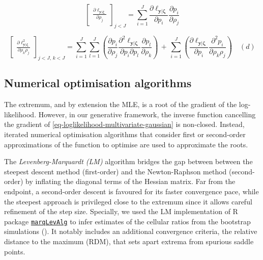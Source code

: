\documentclass[pdflatex, sn-nature]{sn-jnl}
\theoremstyle{thmstyleone}%
\theoremstyle{thmstyletwo}%
\theoremstyle{thmstylethree}%
\begin{document}
\begin{appendices}
        \begin{equation}
            \label{eq-chain-rule-first-order}
            \begin{bmatrix}
                \frac{\partial \ell_{\boldsymbol{y} | \boldsymbol{\zeta}}}{\partial \rho_{j}}
            \end{bmatrix}_{j < J}= \sum_{i=1}^{J} \frac{\partial \ell_{\boldsymbol{y}
            | \boldsymbol{\zeta}}}{\partial p_{i}}\frac{\partial p_{i}}{\partial
            \rho_{j}}
        \end{equation}

        \begin{equation}
            \label{eq-chain-rule-second-order}
            \begin{bmatrix}
                \frac{\partial \ell_{\boldsymbol{y}|\boldsymbol{\zeta}}^{2} }{\partial \rho_{k} \rho_{j}}
            \end{bmatrix}_{j < J, \, k < J}= \sum_{i=1}^{J} \sum_{l=1}^{J} \left(
            \frac{\partial p_{i} }{\partial \rho_{j}}\frac{\partial^{2} \ell_{\boldsymbol{y}|\boldsymbol{\zeta}}}{\partial
            p_{i} \partial p_{l}}\frac{\partial p_{l} }{\partial \rho_{k}}\right
            ) \, + \, \sum_{i=1}^{J} \left( \frac{\partial \ell_{\boldsymbol{y}|\boldsymbol{\zeta}}}{\partial
            p_{i}}\frac{\partial^{2} p_{i} }{\partial \rho_{k} \rho_{j}}\right
            ) \quad (d)
        \end{equation}

        \subsection{Numerical optimisation algorithms}

        The extremum, and by extension the MLE, is a root of the gradient of the
        log-likelihood. However, in our generative framework, the inverse
        function cancelling the gradient of
        \ref{eq-loglikelihood-multivariate-gaussian} is non-closed. Instead,
        iterated numerical optimisation algorithms that consider first or second-order
        approximations of the function to optimise are used to approximate the
        roots.

        The \textit{Levenberg-Marquardt (LM)} algorithm \cite{marquardtAlgorithmLeastSquaresEstimation1963} bridges
        the gap between between the steepest descent method (first-order) and the
        Newton-Raphson method (second-order) by inflating the diagonal terms of the
        Hessian matrix. Far from the endpoint, a second-order descent is favoured
        for its faster convergence pace, while the steepest approach is
        privileged close to the extremum since it allows careful refinement of
        the step size. Specially, we used the LM implementation of R package
        \href{https://CRAN.R-project.org/package=marqLevAlg}{\texttt{marqLevAlg}}
        to infer estimates of the cellular ratios from the bootstrap simulations
        (\cite{philippsRobustEfficientOptimization2021}). It notably includes an additional convergence criteria,
        the relative distance to the maximum (RDM), that sets apart extrema from
        spurious saddle points.


\end{appendices}
\end{document}
